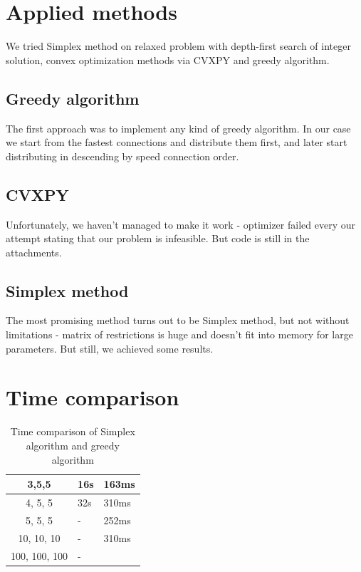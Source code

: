 \documentclass[10pt,a4paper]{article}
\begin{document}
\pagebreak

\section*{Applied methods}

We tried Simplex method on relaxed problem with depth-first search of integer solution, convex optimization methods via CVXPY and greedy algorithm.

\subsection*{Greedy algorithm}
The first approach was to implement any kind of greedy algorithm. In our case we start from the fastest connections and distribute them first, and later start distributing in descending by speed connection order. 

\subsection*{CVXPY}
Unfortunately, we haven't managed to make it work - optimizer failed every our attempt stating that our problem is infeasible. But code is still in the attachments.

\subsection*{Simplex method}
The most promising method turns out to be Simplex method, but not without limitations - matrix of restrictions is huge and doesn't fit into memory for large parameters. But still, we achieved some results.

\section*{Time comparison}
\begin{table}[h]
\begin{center}
	\begin{tabular}{|c|l|l|}
		\hline 3,5,5         & 16s & 163ms \\
		\hline 4, 5, 5       & 32s & 310ms \\
		\hline 5, 5, 5       & -   & 252ms \\
		\hline 10, 10, 10    & -   & 310ms \\
		\hline 100, 100, 100 & -   &        \\
		\hline 
	\end{tabular}
	\caption{Time comparison of Simplex algorithm and greedy algorithm}
\end{center}
\end{table}
\end{document}
